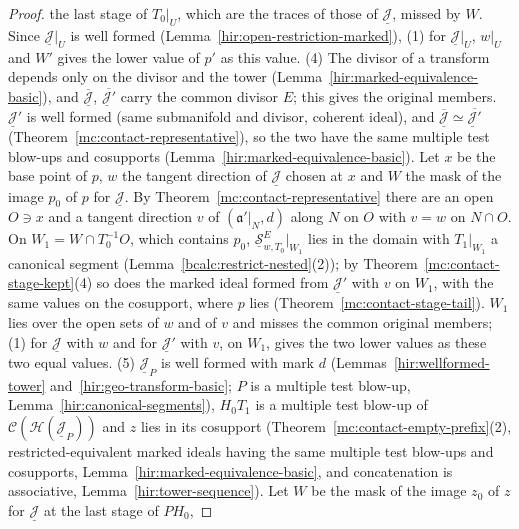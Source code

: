 \begin{proof}
the last stage of \(T_0|_U\), which are the traces of those of \(\underline{\mathcal J}\), missed by \(W\). Since \(\underline{\mathcal J}|_U\) is well formed
(Lemma~\ref{hir:open-restriction-marked}), (1) for \(\underline{\mathcal J}|_U\), \(w|_U\) and \(W'\) gives the lower value of \(p'\) as this value.
(4) The divisor of a transform depends only on the divisor and the tower (Lemma~\ref{hir:marked-equivalence-basic}), and \(\overline{\underline{\mathcal J}}\),
\(\overline{\underline{\mathcal J}'}\) carry the common divisor \(E\); this gives the original members. \(\underline{\mathcal J}'\) is well formed (same submanifold and divisor,
coherent ideal), and \(\overline{\underline{\mathcal J}}\simeq\overline{\underline{\mathcal J}'}\) (Theorem~\ref{mc:contact-representative}), so the two have the same multiple test blow-ups
and cosupports (Lemma~\ref{hir:marked-equivalence-basic}). Let \(x\) be the base point of \(p\), \(w\) the tangent direction of \(\underline{\mathcal J}\) chosen at \(x\) and \(W\)
the mask of the image \(p_0\) of \(p\) for \(\underline{\mathcal J}\). By Theorem~\ref{mc:contact-representative} there are an open \(O\ni x\) and a tangent direction \(v\) of
\((\mathfrak a'|_N,d)\) along \(N\) on \(O\) with \(v=w\) on \(N\cap O\). On \(W_1=W\cap T_0^{-1}O\), which contains \(p_0\), \(\underline{\mathcal S}^E_{w,T_0}|_{W_1}\) lies in the
domain with \(T_1|_{W_1}\) a canonical segment (Lemma~\ref{bcalc:restrict-nested}(2)); by Theorem~\ref{mc:contact-stage-kept}(4) so does the marked ideal formed from
\(\underline{\mathcal J}'\) with \(v\) on \(W_1\), with the same values on the cosupport, where \(p\) lies (Theorem~\ref{mc:contact-stage-tail}). \(W_1\) lies over the open sets of
\(w\) and of \(v\) and misses the common original members; (1) for \(\underline{\mathcal J}\) with \(w\) and for \(\underline{\mathcal J}'\) with \(v\), on \(W_1\), gives the two lower values
as these two equal values.
(5) \(\underline{\mathcal J}_P\) is well formed with mark \(d\) (Lemmas~\ref{hir:wellformed-tower} and~\ref{hir:geo-transform-basic}; \(P\) is a multiple test blow-up,
Lemma~\ref{hir:canonical-segments}), \(H_0T_1\) is a multiple test blow-up of \(\mathcal C(\mathcal H(\underline{\mathcal J}_P))\) and \(z\) lies in its cosupport
(Theorem~\ref{mc:contact-empty-prefix}(2), restricted-equivalent marked ideals having the same multiple test blow-ups and cosupports, Lemma~\ref{hir:marked-equivalence-basic}, and
concatenation is associative, Lemma~\ref{hir:tower-sequence}). Let \(W\) be the mask of the image \(z_0\) of \(z\) for \(\underline{\mathcal J}\) at the last stage of \(PH_0\),

\end{proof}

